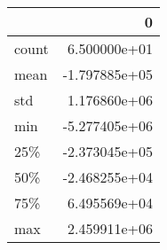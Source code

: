 \begin{tabular}{lr}
\toprule
{} &             0 \\
\midrule
count &  6.500000e+01 \\
mean  & -1.797885e+05 \\
std   &  1.176860e+06 \\
min   & -5.277405e+06 \\
25\%   & -2.373045e+05 \\
50\%   & -2.468255e+04 \\
75\%   &  6.495569e+04 \\
max   &  2.459911e+06 \\
\bottomrule
\end{tabular}
